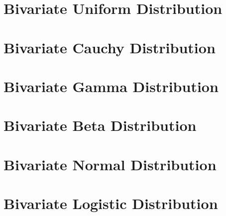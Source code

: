\section{Bivariate Uniform Distribution}

\section{Bivariate Cauchy Distribution}

\section{Bivariate Gamma Distribution}

\section{Bivariate Beta Distribution}

\section{Bivariate Normal Distribution}

\section{Bivariate Logistic Distribution}

